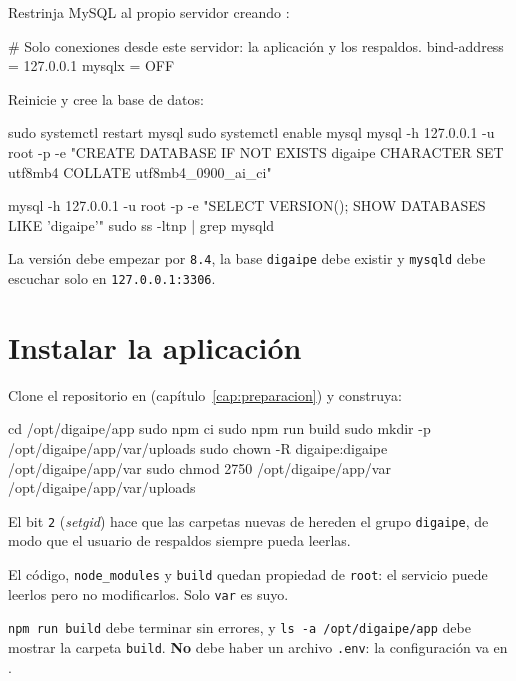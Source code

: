 Restrinja MySQL al propio servidor creando :

\begin{codigo}[label={/etc/mysql/mysql.conf.d/digaipe.cnf}]
[mysqld]
# Solo conexiones desde este servidor: la aplicación y los respaldos.
bind-address = 127.0.0.1
mysqlx = OFF
\end{codigo}

Reinicie y cree la base de datos:

\begin{codigo}
sudo systemctl restart mysql
sudo systemctl enable mysql
mysql -h 127.0.0.1 -u root -p -e "CREATE DATABASE IF NOT EXISTS digaipe CHARACTER SET utf8mb4 COLLATE utf8mb4_0900_ai_ci"
\end{codigo}

\begin{comprobar}
	\begin{codigo}
mysql -h 127.0.0.1 -u root -p -e "SELECT VERSION(); SHOW DATABASES LIKE 'digaipe'"
sudo ss -ltnp | grep mysqld
	\end{codigo}
	La versión debe empezar por \texttt{8.4}, la base \texttt{digaipe} debe existir y
	\texttt{mysqld} debe escuchar solo en \texttt{127.0.0.1:3306}.
\end{comprobar}

\section{Instalar la aplicación}

Clone el repositorio en  (capítulo~\ref{cap:preparacion}) y construya:

\begin{codigo}
cd /opt/digaipe/app
sudo npm ci
sudo npm run build
sudo mkdir -p /opt/digaipe/app/var/uploads
sudo chown -R digaipe:digaipe /opt/digaipe/app/var
sudo chmod 2750 /opt/digaipe/app/var /opt/digaipe/app/var/uploads
\end{codigo}

El bit \texttt{2} (\emph{setgid}) hace que las carpetas nuevas de  hereden el
grupo \texttt{digaipe}, de modo que el usuario de respaldos siempre pueda leerlas.

El código, \texttt{node\_modules} y \texttt{build} quedan propiedad de \texttt{root}: el
servicio puede leerlos pero no modificarlos. Solo \texttt{var} es suyo.

\begin{comprobar}
	\texttt{npm run build} debe terminar sin errores, y \texttt{ls -a /opt/digaipe/app} debe
	mostrar la carpeta \texttt{build}. \textbf{No} debe haber un archivo \texttt{.env}: la
	configuración va en .
\end{comprobar}

